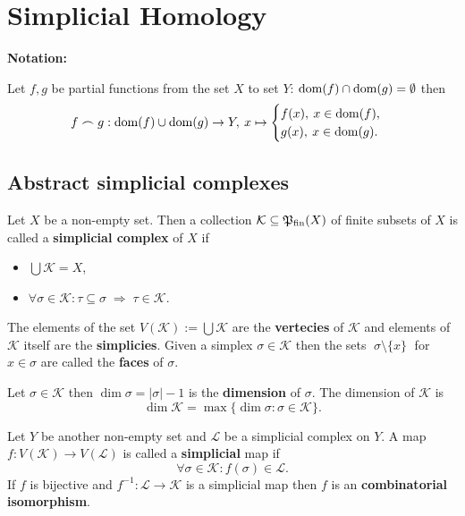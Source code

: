 \section{Simplicial Homology}

\textbf{Notation:}

Let $f, g$ be partial functions from the set $X$ to set $Y$: ${\rm dom}(f) \cap {\rm dom}(g) = \emptyset$ then
\begin{equation*}
  f \frown g: {\rm dom}(f) \cup {\rm dom}(g) \to Y, \: x \mapsto \begin{cases}
    f(x), \: x \in {\rm dom}(f), \\
    g(x), \: x \in {\rm dom}(g).
  \end{cases}
\end{equation*}

\subsection{Abstract simplicial complexes}

\begin{defin}
    Let $X$ be a non-empty set. Then a collection $\mathcal{K} \subseteq \mathfrak{P}_{\text{fin}}(X)$ of finite subsets of $X$ is called a 
    \textbf{simplicial complex} of $X$ if
    \begin{itemize}
        \item $\bigcup \mathcal{K} = X$,
        \item $\forall \sigma\in\mathcal{K} \colon \tau \subseteq \sigma \; \Rightarrow \; \tau \in \mathcal{K}$.
    \end{itemize}
    The elements of the set $V(\mathcal{K}) := \bigcup \mathcal{K}$ are the \textbf{vertecies} of $\mathcal{K}$ and
    elements of $\mathcal{K}$ itself are the \textbf{simplicies}. Given a simplex $\sigma \in \mathcal{K}$ then the sets
    $\; \sigma \setminus \{x\} \;$ for $x \in \sigma$ are called the \textbf{faces} of $\sigma$.

    Let $\sigma \in \mathcal{K}$ then $\dim \sigma = |\sigma| -1$ is the \textbf{dimension} of $\sigma$. The dimension of $\mathcal{K}$ is
    \begin{equation*}
      \dim \mathcal{K} = \max\{\dim \sigma\colon \sigma \in \mathcal{K}\}.
    \end{equation*} 
    
    Let $Y$ be another non-empty set and $\mathcal{L}$ be a simplicial complex on $Y$. A map $f: V(\mathcal{K}) \to V(\mathcal{L})$ is called 
    a \textbf{simplicial} map if
    \begin{equation*}
        \forall \sigma \in \mathcal{K}\colon f(\sigma) \in \mathcal{L}.
    \end{equation*}
    If $f$ is bijective and $f^{-1}\colon \mathcal{L} \to \mathcal{K}$ is a simplicial map then $f$ is an \textbf{combinatorial isomorphism}.
\end{defin}

